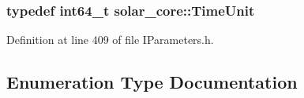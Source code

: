 \hypertarget{namespacesolar__core_a4b5949d07259da6f8a20d12a30403e90}{}
\subsubsection[{Time\+Unit}]{\setlength{\rightskip}{0pt plus 5cm}typedef int64\+\_\+t {\bf solar\+\_\+core\+::\+Time\+Unit}}\label{namespacesolar__core_a4b5949d07259da6f8a20d12a30403e90}


Definition at line 409 of file I\+Parameters.\+h.



\subsection{Enumeration Type Documentation}
\hypertarget{namespacesolar__core_ac827fdef4412a3c0d5e44d3f31908e49}{}
